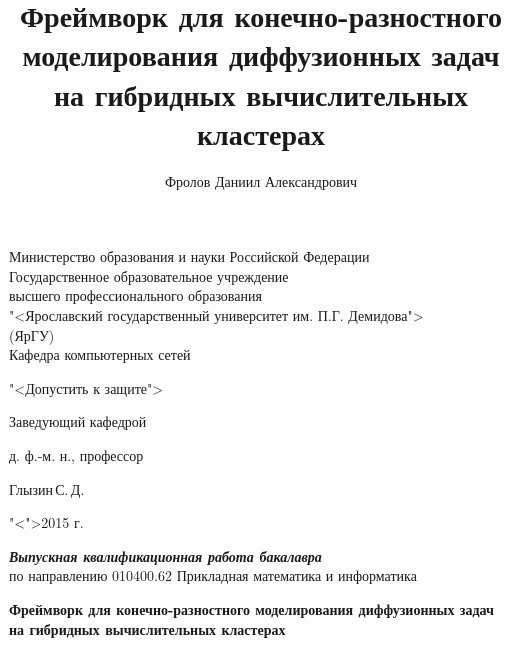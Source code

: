 \documentclass[a4paper, 14pt]{extarticle}
\title{Фреймворк для конечно-разностного моделирования диффузионных задач на гибридных вычислительных кластерах}
\author{Фролов Даниил Александрович}
\theoremstyle{definition}
\begin{document}
\setcounter{tocdepth}{3}

\makeatletter
\AtEndDocument{%
	\addtocounter{totfigures}{\value{figure}}%
	\addtocounter{tottables}{\value{table}}%
	\addtocounter{totsections}{\value{section}}%
	\immediate\write\@mainaux{%
		\string\gdef\string\totfig{\number\value{totfigures}}%
		\string\gdef\string\tottab{\number\value{tottables}}%
		\string\gdef\string\totsections{\number\value{totsections}}%
	}%
}
\makeatother


{
\thispagestyle{empty}

\begin{center}
	
	Министерство образования и науки Российской Федерации\\[0.3cm]
	Государственное образовательное учреждение\\
	высшего профессионального образования\\
	"<Ярославский государственный университет им. П.Г. Демидова">\\
	(ЯрГУ)\\[0.3cm]
	
	Кафедра компьютерных сетей
	
	\bigskip
	
	\hspace{15em}"<Допустить к защите">
	
	\begin{flushright}
		Заведующий кафедрой\par
		д. ф.-м. н., профессор\par
		\underline{\hspace{3.2cm}}Глызин\,С.\,Д.\par
		"<\underline{\hspace{0.5cm}}">\underline{\hspace{3.4cm}}2015 г.\par
	\end{flushright}
	
	\bigskip
	
	{\textbf
		{\textit
			{Выпускная квалификационная работа бакалавра}
		}
	}
	\\
	по направлению 010400.62 Прикладная математика и информатика
	
	\bigskip
	
	{\bf
		Фреймворк для конечно-разностного моделирования диффузионных задач на гибридных вычислительных кластерах 
	}
\end{center}

}
\end{document}
